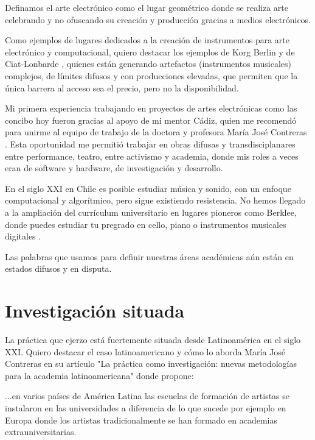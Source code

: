 \documentclass{article}
\begin{document}
Definamos el arte electrónico como el lugar geométrico donde se realiza arte celebrando y no ofuscando su creación y producción gracias a medios electrónicos.

Como ejemplos de lugares dedicados a la creación de instrumentos para arte electrónico y computacional, quiero destacar los ejemplos de Korg Berlin \cite{korgBerlin} y de Ciat-Lonbarde \cite{ciatLonbarde}, quienes están generando artefactos (instrumentos musicales) complejos, de límites difusos y con producciones elevadas, que permiten que la única barrera al acceso sea el precio, pero no la disponibilidad.

Mi primera experiencia trabajando en proyectos de artes electrónicas como las concibo hoy fueron gracias al apoyo de mi mentor Cádiz, quien me recomendó para unirme al equipo de trabajo de la doctora y profesora María José Contreras \cite{mariaJoseContreras}. Esta oportunidad me permitió trabajar en obras difusas y transdisciplanares entre performance, teatro, entre activismo y academia, donde mis roles a veces eran de software y hardware, de investigación y desarrollo.

En el siglo XXI en Chile es posible estudiar música y sonido, con un enfoque computacional y algorítmico, pero sigue existiendo resistencia. No hemos llegado a la ampliación del currículum universitario en lugares pioneros como Berklee, donde puedes estudiar tu pregrado en cello, piano o instrumentos musicales digitales \cite{berklee}.

Las palabras que usamos para definir nuestras áreas académicas aún están en estados difusos y en disputa.

\clearpage

\section{Investigación situada}

La práctica que ejerzo está fuertemente situada desde Latinoamérica en el siglo XXI. Quiero destacar el caso latinoamericano y cómo lo aborda María José Contreras en su artículo "La práctica como investigación: nuevas metodologías para la academia latinoamericana" \cite{practicaComoInvestigacion} donde propone:

\begin{displayquote}
    ...en varios países de América Latina las escuelas de formación de artistas se instalaron en las universidades a diferencia de lo que sucede por ejemplo en Europa donde los artistas tradicionalmente se han formado en academias extrauniversitarias.
\end{displayquote}
\end{document}
